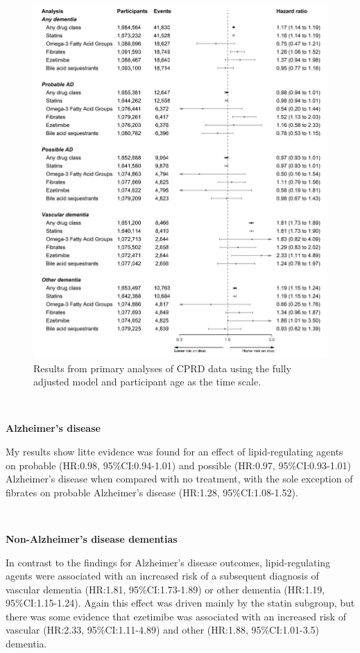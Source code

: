 \documentclass[a4paper, twoside]{templates/ociamthesis}
\begin{document}
\begin{figure}[H]
\includegraphics[width=1\linewidth]{figures/cprd-analysis/forester_p1} \caption[Results from primary analyses of CPRD data]{Results from primary analyses of CPRD data using the fully adjusted model and participant age as the time scale.}\label{fig:cprdPrimary}
\end{figure}

~

\textbf{Alzheimer's disease}

My results show litte evidence was found for an effect of lipid-regulating agents on probable (HR:0.98, 95\%CI:0.94-1.01) and possible (HR:0.97, 95\%CI:0.93-1.01) Alzheimer's disease when compared with no treatment, with the sole exception of fibrates on probable Alzheimer's disease (HR:1.28, 95\%CI:1.08-1.52).

~

\textbf{Non-Alzheimer's disease dementias}

In contrast to the findings for Alzheimer's disease outcomes, lipid-regulating agents were associated with an increased risk of a subsequent diagnosis of vascular dementia (HR:1.81, 95\%CI:1.73-1.89) or other dementia (HR:1.19, 95\%CI:1.15-1.24). Again this effect was driven mainly by the statin subgroup, but there was some evidence that ezetimibe was associated with an increased risk of vascular (HR:2.33, 95\%CI:1.11-4.89) and other (HR:1.88, 95\%CI:1.01-3.5) dementia.
\end{document}
